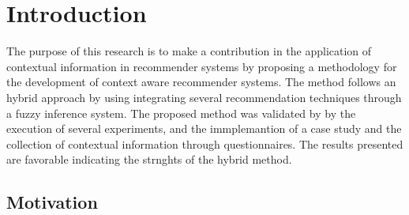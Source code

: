 \chapter{Introduction} \label{introduction} 

The purpose of this research is to make a contribution in the
application of contextual information in recommender systems by
proposing a methodology for the development of context aware
recommender systems. The method follows an hybrid  approach by using
integrating several recommendation techniques through a fuzzy
inference system. The proposed method was validated by  by the
execution of several experiments, and the immplemantion of a case
study and the collection of contextual information through
questionnaires. The results presented are favorable  indicating the
strnghts of the hybrid method.

\section{Motivation}

